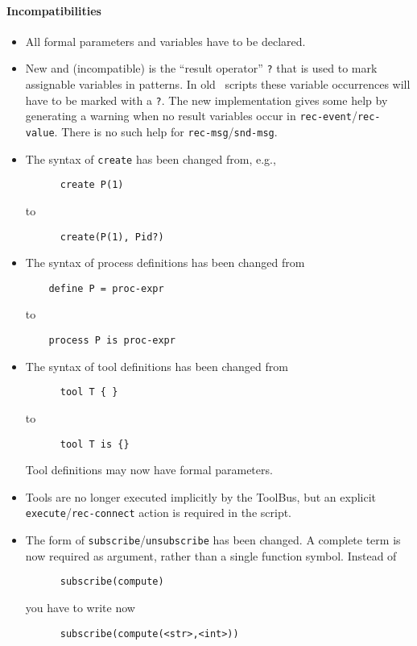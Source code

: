 \paragraph{Incompatibilities}
\begin{itemize}

\item All formal parameters and variables have to be declared.

\item New and (incompatible) is the ``result operator'' {\tt ?} that is used
  to mark assignable variables in patterns. In old \T\ scripts these
  variable occurrences will have to be marked with a {\tt ?}.
  The new implementation gives some help by generating
  a warning when no result variables occur in {\tt rec-event}/{\tt rec-value}.
  There is no such help for {\tt rec-msg}/{\tt snd-msg}.

\item The syntax of {\tt create} has been changed from, e.g.,
\begin{verbatim}
      create P(1)
\end{verbatim}
to
\begin{verbatim}
      create(P(1), Pid?)
\end{verbatim}

\item The syntax of process definitions has been changed from
\begin{verbatim}
	define P = proc-expr
\end{verbatim}
  to
\begin{verbatim}
	process P is proc-expr
\end{verbatim}

\item  The syntax of tool definitions has been changed from
\begin{verbatim}
      tool T { }
\end{verbatim}
  to
\begin{verbatim}
      tool T is {}
\end{verbatim}
Tool definitions may now have formal parameters.

\item Tools are no longer executed implicitly by the ToolBus, but an
  explicit {\tt execute}/{\tt rec-connect} action is required in the script.

\item The form of {\tt subscribe}/{\tt unsubscribe} has been changed. A complete
  term is now required as argument, rather than a single function
  symbol. Instead of
\begin{verbatim}
      subscribe(compute)
\end{verbatim}
  you have to write now
\begin{verbatim}
      subscribe(compute(<str>,<int>))
\end{verbatim}

\end{itemize}

